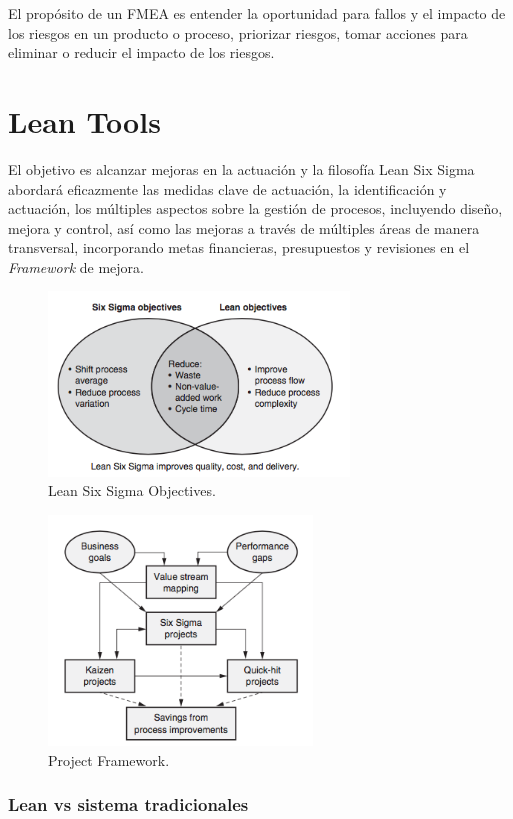 \documentclass[]{article}
\begin{document}
El propósito de un FMEA es entender la oportunidad para fallos y el impacto de los riesgos en un producto o proceso, priorizar riesgos, tomar acciones para eliminar o reducir el impacto de los riesgos.

\section{Lean Tools}
El objetivo es alcanzar mejoras en la actuación y la filosofía Lean Six Sigma abordará eficazmente las medidas clave de actuación, la identificación y actuación, los múltiples aspectos sobre la gestión de procesos, incluyendo diseño, mejora y control, así como las mejoras a través de múltiples áreas de manera transversal, incorporando metas financieras, presupuestos y revisiones en el \textit{Framework} de mejora.

\begin{figure}[H]
	\centering
	\includegraphics[width=80mm]{imagenes/LeanSixSigmaObjectives.png}
	\caption{Lean Six Sigma Objectives.}
	\label{fig:LeanSixSigmaObjectives}
\end{figure}

\begin{figure}[H]
	\centering
	\includegraphics[width=70mm]{imagenes/ProjectFramework.png}
	\caption{Project Framework.}
	\label{fig:ProjectFramework}
\end{figure}

\subsubsection{Lean vs sistema tradicionales}
\end{document}
